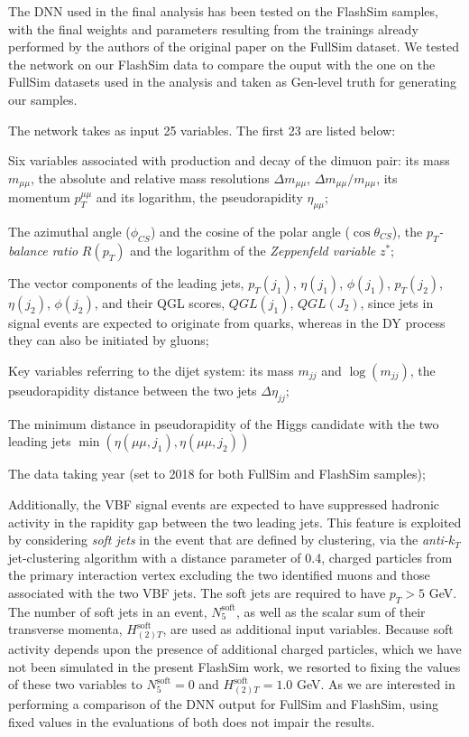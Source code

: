 The DNN used in the final analysis has been tested on the FlashSim samples, with the final weights and parameters resulting from the trainings already performed by the authors of the original paper on the FullSim dataset. We tested the network on our FlashSim data to compare the ouput with the one on the FullSim datasets used in the analysis and taken as Gen-level truth for generating our samples.

The network takes as input 25 variables. The first 23 are listed below:

\begin{outline}
\1 Six variables associated with production and decay of the dimuon pair: its mass $m_{\mu\mu}$, the absolute and relative mass resolutions $\Delta m_{\mu\mu}$, $\Delta m_{\mu\mu}/m_{\mu\mu}$, its momentum $p_T^{\mu\mu}$ and its logarithm, the pseudorapidity $\eta_{\mu\mu}$;

\1 The azimuthal angle ($\phi_{CS}$) and the cosine of the polar angle ($\cos\theta_{CS}$), the $p_T$\emph{-balance ratio} $R(p_T)$ and the logarithm of the \emph{Zeppenfeld variable} $z^*$;

\1 The vector components of the leading jets, $p_T(j_1)$, $\eta(j_1)$, $\phi(j_1)$, $p_T(j_2)$, $\eta(j_2)$, $\phi(j_2)$, and their QGL scores, $QGL(j_1)$, $QGL(J_2)$, since jets in signal events are expected to originate from quarks, whereas in the DY process they can also be initiated by gluons;

\1 Key variables referring to the dijet system: its mass $m_{jj}$ and $\log(m_{jj})$, the pseudorapidity distance between the two jets $\Delta \eta_{jj}$;

\1  The minimum distance in pseudorapidity of the Higgs candidate with the two leading jets $\min(\eta(\mu\mu, j_1),\eta(\mu\mu, j_2))$

\1 The data taking year (set to 2018 for both FullSim and FlashSim samples);
\end{outline}

Additionally, the VBF signal events are expected to have suppressed hadronic activity in the rapidity gap between the two leading jets. This feature is exploited by considering \emph{soft jets} in the event that are defined by clustering, via the \emph{anti-}$k_T$ jet-clustering algorithm with a distance parameter of 0.4, charged particles from the primary interaction vertex excluding the two identified muons and those associated with the two VBF jets. The soft jets are required to have $p_T>5$ GeV. The number of soft jets in an event, $N^{\text{soft}}_5$, as well as the scalar sum of their transverse momenta, $H^{\text{soft}}_{(2)T}$, are used as additional input variables. 
Because soft activity depends upon the presence of additional charged particles, which we have not been simulated in the present FlashSim work, we resorted to fixing the values of these two variables to $N^{\text{soft}}_5=0$ and $H^{\text{soft}}_{(2)T}=1.0$ GeV. As we are interested in performing a comparison of the DNN output for FullSim and FlashSim, using fixed values in the evaluations of both does not impair the results.


